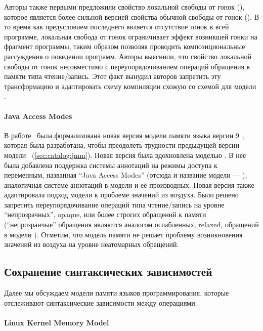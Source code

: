 Авторы также первыми предложили свойство локальной свободы от гонок (\lDRF),
которое является более сильной версией свойства обычной свободы от гонок (\eDRF).
В то время как предусловием последнего является отсутствие 
гонок в всей программе, локальная свобода от гонок 
ограничивает эффект возникшей гонки на фрагмент программы, 
таким образом позволяя проводить композициональные рассуждения 
о поведении программ. 
Авторы выяснили, что свойство локальной свободы от гонок 
несовместимо с переупорядочиванием операций обращения к памяти типа чтение/запись.  
Этот факт вынудил авторов запретить эту трансформацию 
и адаптировать схему компиляции схожую со схемой для модели \RCMM. 

\paragraph{Java Access Modes}

В работе~\cite{Bender-Palsberg:OOPSLA19} была формализована 
новая версия модели памяти языка \Java версии 9~\cite{JDK9-VarHandle, JEP:193, JDK9-Modes}, 
которая была разработана, чтобы преодолеть трудности 
предыдущей версии модели~\cite{Manson-al:POPL05} 
(\see \ref{sec:catalog:jmm}).
Новая версия была вдохновлена моделью \RCMM.
В неё была добавлена поддержка системы аннотаций на режимы доступа к переменным, 
названная ``Java Access Modes'' (отсюда и название модели --- \JAM),
аналогичная системе аннотаций в модели \CMM и её производных. 
Новая версия также адаптировала подход модели \RCMM к 
проблеме значений из воздуха. 
Было решено запретить переупорядочивание операций типа чтение/запись 
на уровне ``непрозрачных'', opaque, или более строгих обращений к памяти
(``непрозранчые'' обращения являются аналогом ослабленных, relaxed, 
обращений в модели \CPP).
Отметим, что модель памяти \JAM не решает проблему возникновения значений 
из воздуха на уровне неатомарных обращений. 

\subsection{Сохранение синтаксических зависимостей}
\label{sec:catalog:deprf}

Далее мы обсуждаем модели памяти языков программирования, 
которые отслеживают синтаксические зависимости между операциями. 

\paragraph{Linux Kernel Memory Model}

